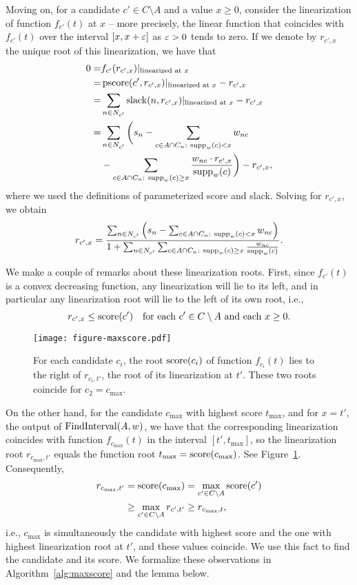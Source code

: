 Moving on, for a candidate $c'\in C\setminus A$ and a value $x\geq 0$, consider the linearization of function $f_{c'}(t)$ at $x$ -- more precisely, the linear function that coincides with $f_{c'}(t)$ over the interval $[x, x+\varepsilon]$ as $\varepsilon>0$ tends to zero. 
If we denote by $r_{c', x}$ the unique root of this linearization, we have that
\begin{align*}
    0=& f_{c'}(r_{c', x})|_{\text{linearized at } x}\\
    =& \operatorname{pscore}(c', r_{c', x})|_{\text{linearized at } x} - r_{c', x}\\
    =& \sum_{n\in N_{c'}} \operatorname{slack}(n,r_{c', x})|_{\text{linearized at } x} - r_{c', x}\\
    =& \sum_{n\in N_{c'}} \bigg( s_n - \sum_{c\in A\cap C_n: \ \operatorname{supp}_{w}(c)< x}w_{nc} \\
		&- \sum_{c\in A\cap C_n: \ \operatorname{supp}_w(c)\geq x} \frac{w_{nc}\cdot r_{c', x} }{\operatorname{supp}_w(c)} \bigg) - r_{c', x},
\end{align*} 
%
where we used the definitions of parameterized score and slack. Solving for $r_{c', x}$, we obtain
%
\begin{align}\label{eq:linearized}
    r_{c', x}=\frac{\sum_{n\in N_{c'}} \Big( s_n - \sum_{c\in A\cap C_n: \ \supp_w(c)< x} w_{nc} \Big)}%
    {1+\sum_{n\in N_{c'}} \sum_{c\in A\cap C_n: \ \supp_w(c)\geq x} \frac{w_{nc}}{\supp_w(c)}}.
\end{align}

We make a couple of remarks about these linearization roots. 
First, since $f_{c'}(t)$ is a convex decreasing function, any linearization will lie to its left, and in particular any linearization root will lie to the left of its own root, i.e., 
$$r_{c', x}\leq \operatorname{score}(c') \quad \text{for each } c'\in C\setminus A \text{ and each } x\geq 0.$$

\begin{figure}[h]
  \centering
	\texttt{[image: figure-maxscore.pdf]}
  \caption{For each candidate $c_i$, the root $\operatorname{score}(c_i)$ of function $f_{c_i}(t)$ lies to the right of $r_{c_i, t'}$, the root of its linearization at $t'$. These two roots coincide for $c_2=c_{\max}$. }
  \label{fig:maxscore}
\end{figure}

On the other hand, for the candidate $c_{\max}$ with highest score $t_{\max}$, and for $x=t'$, the output of $\operatorname{FindInterval}(A,w)$, we have that the corresponding linearization coincides with function $f_{c_{\max}}(t)$ in the interval $[t', t_{\max}]$, so the linearization root $r_{c_{\max}, t'}$ equals the function root $t_{\max}=\operatorname{score}(c_{\max})$. 
See Figure~\ref{fig:maxscore}. Consequently, %
%
\begin{align*}
r_{c_{\max}, t'} &= \operatorname{score}(c_{\max}) = \max_{c'\in C\setminus A} \operatorname{score}(c') \\
	&\geq \max_{c'\in C\setminus A} r_{c', t'} \geq r_{c_{\max}, t},
\end{align*}
%
i.e., $c_{\max}$ is simultaneously the candidate with highest score and the one with highest linearization root at $t'$, and these values coincide. 
We use this fact to find the candidate and its score. We formalize these observations in Algorithm~\ref{alg:maxscore} and the lemma below.

